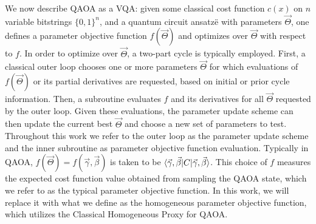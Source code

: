 \documentclass[superscriptaddress,pra,aps,10pt,longbibliography,notitlepage]{revtex4-1}
\begin{document}
We now describe QAOA as a VQA: given some classical cost function $c(x)$ on $n$ variable bitstrings $\{0,1\}^n$, and a quantum circuit ansatz\"e with parameters $\vec{\Theta}$, one defines a parameter objective function $f(\vec{\Theta})$ and optimizes over $\vec{\Theta}$ with respect to $f$. In order to optimize over $\vec{\Theta}$, a two-part cycle is typically employed. First, a classical outer loop chooses one or more parameters $\vec{\Theta}$ for which evaluations of $f(\vec{\Theta})$ or its partial derivatives are requested, based on initial or prior cycle information. Then, a subroutine evaluates $f$ and its derivatives for all $\vec{\Theta}$ requested by the outer loop. Given these evaluations, the parameter update scheme can then update the current best $\vec{\Theta}$ and choose a new set of parameters to test. Throughout this work we refer to the outer loop as the parameter update scheme and the inner subroutine as parameter objective function evaluation. Typically in QAOA, $f(\vec{\Theta})= f(\vec{\gamma},\vec{\beta})$ is taken to be $\braket{\vec{\gamma},\vec{\beta}|C|\vec{\gamma},\vec{\beta}}$. This choice of $f$ measures the expected cost function value obtained from sampling the QAOA state, which we refer to as the typical parameter objective function. In this work, we will replace it with what we define as the homogeneous parameter objective function, which utilizes the Classical Homogeneous Proxy for QAOA.
\end{document}
